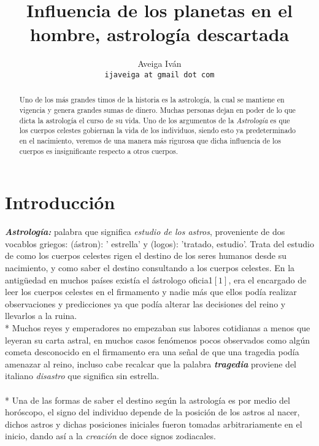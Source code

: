 \documentclass[a4paper,11pt]{article}
\begin{document}
\author{
Aveiga Iván \\
\texttt{ijaveiga at gmail dot com}
}
\title{Influencia de los planetas en el hombre, astrología descartada}
\maketitle
\begin{abstract}
Uno de los m\'as grandes timos de la historia es la astrolog\'ia, la cual se mantiene en vigencia y genera
grandes sumas de dinero. Muchas personas dejan en poder de lo que dicta la astrolog\'ia el curso de su vida.
Uno de los argumentos de la \emph{Astrolog\'ia} es que los cuerpos celestes gobiernan la vida de los individuos, siendo
esto ya predeterminado en el nacimiento, veremos de una manera m\'as rigurosa que dicha influencia de los 
cuerpos es insignificante respecto a otros cuerpos.
\end{abstract}
\newpage
\section{Introducción}
\emph{\textbf{Astrolog\'ia:}} palabra que significa \emph{estudio de los astros}, proveniente de dos vocablos griegos:
(\'astron): ' estrella' y (logos): 'tratado, estudio'. Trata del estudio de como los cuerpos celestes rigen el destino
de los seres humanos desde su nacimiento, y como saber el destino consultando a los cuerpos celestes.
En la antigüedad en muchos pa\'ises exist\'ia el \'astrologo oficia1$[1]$, era el encargado de leer los cuerpos celestes en el firmamento y nadie m\'as que ellos pod\'ia realizar observaciones y predicciones ya que pod\'ia alterar las decisiones del reino y llevarlos a la ruina.\\*
Muchos reyes y emperadores no empezaban sus labores cotidianas a menos que leyeran su carta astral, en muchos casos
fen\'omenos pocos observados como alg\'un cometa desconocido en el firmamento era una señal de que una tragedia pod\'ia 
amenazar al reino, incluso cabe recalcar que la palabra \emph{\textbf{tragedia}} proviene del italiano \emph{disastro} que significa
sin estrella.  \\ \\*
Una de las formas de saber el destino seg\'un la astrolog\'ia es por medio del hor\'oscopo, el signo del individuo  depende de la posici\'on de los astros al nacer, dichos astros y dichas posiciones iniciales fueron tomadas arbitrariamente en el inicio, dando as\'i a la \emph{creaci\'on} de doce signos zodiacales.
\end{document}
